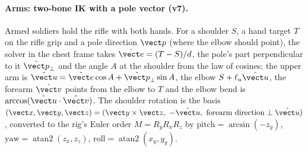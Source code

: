 \paragraph{Arms: two-bone IK with a pole vector (v7).} Armed soldiers hold the rifle with both hands. For a shoulder $S$, a hand target $T$ on the rifle grip and a pole direction $\vect p$ (where the elbow should point), the solver in the chest frame takes $\hat{\vect e}=(T-S)/d$, the pole's part perpendicular to it $\hat{\vect p}_\perp$ and the angle $A$ at the shoulder from the law of cosines; the upper arm is $\hat{\vect u}=\hat{\vect e}\cos A+\hat{\vect p}_\perp\sin A$, the elbow $S+\ell_u\hat{\vect u}$, the forearm $\hat{\vect v}$ points from the elbow to $T$ and the elbow bend is $\arccos(\hat{\vect u}\cdot\hat{\vect v})$. The shoulder rotation is the basis $(\vect x,\vect y,\vect z)=(\vect y\times\vect z,\ -\hat{\vect u},\ \text{forearm direction}\perp\hat{\vect u})$, converted to the rig's Euler order $M=R_yR_xR_z$ by $\text{pitch}=\arcsin(-z_y)$, $\text{yaw}=\operatorname{atan2}(z_x,z_z)$, $\text{roll}=\operatorname{atan2}(x_y,y_y)$.
\lstArmIK

